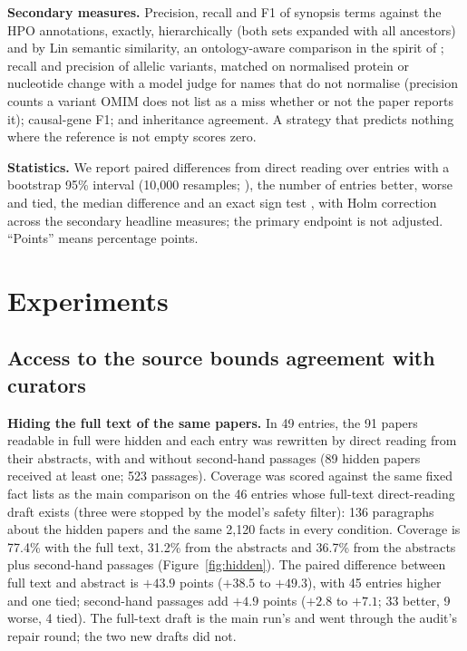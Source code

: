 \documentclass{article} %
\begin{document}
\textbf{Secondary measures.} Precision, recall and F1 of synopsis terms against the HPO annotations, exactly, hierarchically (both sets expanded with all ancestors) and by Lin semantic similarity, an ontology-aware comparison in the spirit of \citet{Khler2009ClinicalDiagnostics}; recall and precision of allelic variants, matched on normalised protein or nucleotide change with a model judge for names that do not normalise (precision counts a variant OMIM does not list as a miss whether or not the paper reports it); causal-gene F1; and inheritance agreement. A strategy that predicts nothing where the reference is not empty scores zero.

\textbf{Statistics.} We report paired differences from direct reading over entries with a bootstrap 95\% interval (10,000 resamples; \citealp{Efron1979BootstrapMethods}), the number of entries better, worse and tied, the median difference and an exact sign test \citep{Dixon1946StatisticalSign}, with Holm correction \citep{holm1979simple} across the secondary headline measures; the primary endpoint is not adjusted. ``Points'' means percentage points.

\section{Experiments}
\label{sec:experiments}
\subsection{Access to the source bounds agreement with curators}
\label{sec:access}
\textbf{Hiding the full text of the same papers.} In 49 entries, the 91 papers readable in full were hidden and each entry was rewritten by direct reading from their abstracts, with and without second-hand passages (89 hidden papers received at least one; 523 passages). Coverage was scored against the same fixed fact lists as the main comparison on the 46 entries whose full-text direct-reading draft exists (three were stopped by the model's safety filter): 136 paragraphs about the hidden papers and the same 2,120 facts in every condition. Coverage is 77.4\% with the full text, 31.2\% from the abstracts and 36.7\% from the abstracts plus second-hand passages (Figure~\ref{fig:hidden}). The paired difference between full text and abstract is $+43.9$ points ($+38.5$ to $+49.3$), with 45 entries higher and one tied; second-hand passages add $+4.9$ points ($+2.8$ to $+7.1$; 33 better, 9 worse, 4 tied). The full-text draft is the main run's and went through the audit's repair round; the two new drafts did not.
\end{document}

